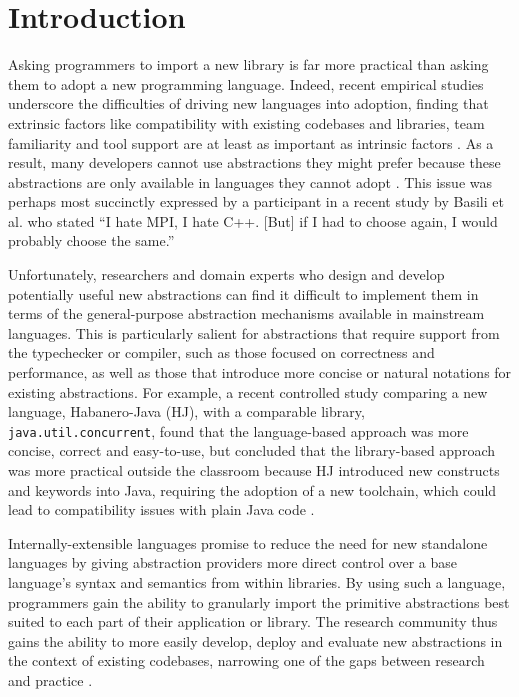 \documentclass[9pt,preprint]{sigplanconf}
\begin{document}
\section{Introduction}
Asking programmers to import a new library is far more practical than asking them to  adopt a new programming language. Indeed, recent empirical studies underscore  the difficulties of driving new languages into adoption, finding that extrinsic factors like compatibility with existing codebases and libraries, team familiarity and tool support are at least as important as intrinsic factors \cite{Meyerovich:2013:EAP:2509136.2509515,chen05,nguyen2010survey}. As a result, many developers cannot use  abstractions they might prefer because these abstractions are only available in languages they cannot adopt \cite{Meyerovich:2012:SDR:2414721.2414724,Meyerovich:2013:EAP:2509136.2509515}. This issue was perhaps most succinctly expressed by a participant in a recent study by Basili et al. \cite{basili2008understanding} who stated ``I hate MPI, I hate C++. [But] if I had to choose again, I would probably choose the same.''

Unfortunately, researchers and domain experts who design and develop potentially useful new abstractions can find it difficult to implement them in terms of the general-purpose abstraction mechanisms available in mainstream languages. This is particularly salient for abstractions that require support from the typechecker or compiler, such as those focused on correctness and performance, as well as those that  introduce more concise or natural notations for existing abstractions. For example, a recent controlled study comparing a new language, Habanero-Java (HJ), with a comparable library, \verb|java.util.concurrent|, found that the language-based approach was more concise, correct and easy-to-use, but concluded that the library-based approach was more practical outside the classroom because HJ introduced new constructs and keywords into Java, requiring the adoption of a new toolchain, which could lead to compatibility issues with plain Java code \cite{cave2010comparing}.

Internally-extensible languages promise to reduce the need for new standalone languages by giving abstraction providers more direct control over a base language's syntax and semantics from within libraries. By using such a language, programmers  gain the ability to granularly import the primitive abstractions best suited to each part of their application or library. The research community thus gains the ability to more easily develop, deploy and evaluate new abstractions in the context of existing codebases, narrowing one of the gaps between research and practice \cite{basili2008understanding}. 
\end{document}
